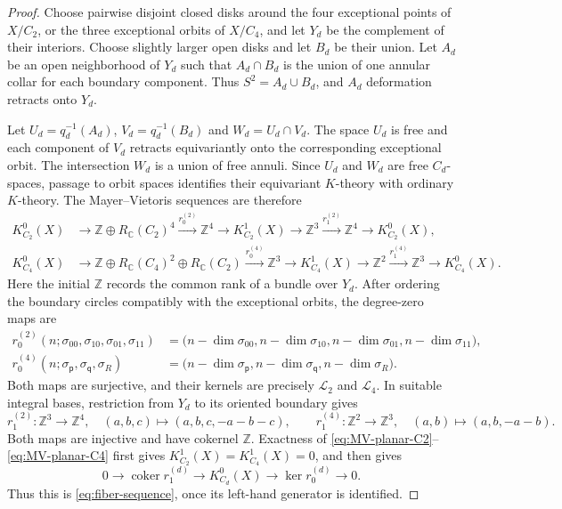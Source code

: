 \documentclass[11pt]{amsart}
\newcommand{\Z}{\mathbb Z}
\newcommand{\C}{\mathbb C}
\newcommand{\coker}{\operatorname{coker}}
\newcommand{\Rep}{R_{\C}}
\theoremstyle{remark}
\numberwithin{equation}{section}
\begin{document}
\begin{proof}
Choose pairwise disjoint closed disks around the four exceptional points of $X/C_2$, or the three exceptional orbits of $X/C_4$, and let $Y_d$ be the complement of their interiors. Choose slightly larger open disks and let $B_d$ be their union. Let $A_d$ be an open neighborhood of $Y_d$ such that $A_d\cap B_d$ is the union of one annular collar for each boundary component. Thus $S^2=A_d\cup B_d$, and $A_d$ deformation retracts onto $Y_d$.

Let $U_d=q_d^{-1}(A_d)$, $V_d=q_d^{-1}(B_d)$ and $W_d=U_d\cap V_d$. The space $U_d$ is free and each component of $V_d$ retracts equivariantly onto the corresponding exceptional orbit. The intersection $W_d$ is a union of free annuli. Since $U_d$ and $W_d$ are free $C_d$-spaces, passage to orbit spaces identifies their equivariant $K$-theory with ordinary $K$-theory. The Mayer--Vietoris sequences are therefore
\begin{align}
 K_{C_2}^0(X)&\longrightarrow
 \Z\oplus\Rep(C_2)^4
 \xrightarrow{r_0^{(2)}}\Z^4
 \longrightarrow K_{C_2}^1(X)
 \longrightarrow\Z^3
 \xrightarrow{r_1^{(2)}}\Z^4
 \longrightarrow K_{C_2}^0(X),
 \label{eq:MV-planar-C2}\\
 K_{C_4}^0(X)&\longrightarrow
 \Z\oplus\Rep(C_4)^2\oplus\Rep(C_2)
 \xrightarrow{r_0^{(4)}}\Z^3
 \longrightarrow K_{C_4}^1(X)
 \longrightarrow\Z^2
 \xrightarrow{r_1^{(4)}}\Z^3
 \longrightarrow K_{C_4}^0(X).
 \label{eq:MV-planar-C4}
\end{align}
Here the initial $\Z$ records the common rank of a bundle over $Y_d$. After ordering the boundary circles compatibly with the exceptional orbits, the degree-zero maps are
\begin{align*}
 r_0^{(2)}(n;\sigma_{00},\sigma_{10},\sigma_{01},\sigma_{11})
 &=\bigl(n-\dim\sigma_{00},n-\dim\sigma_{10},
         n-\dim\sigma_{01},n-\dim\sigma_{11}\bigr),\\
 r_0^{(4)}(n;\sigma_{\mathsf p},\sigma_{\mathsf q},\sigma_R)
 &=\bigl(n-\dim\sigma_{\mathsf p},
         n-\dim\sigma_{\mathsf q},n-\dim\sigma_R\bigr).
\end{align*}
Both maps are surjective, and their kernels are precisely $\mathcal L_2$ and $\mathcal L_4$. In suitable integral bases, restriction from $Y_d$ to its oriented boundary gives
\[
 r_1^{(2)}\colon\Z^3\longrightarrow\Z^4,\quad
 (a,b,c)\longmapsto(a,b,c,-a-b-c),
 \qquad
 r_1^{(4)}\colon\Z^2\longrightarrow\Z^3,\quad
 (a,b)\longmapsto(a,b,-a-b).
\]
Both maps are injective and have cokernel $\Z$. Exactness of \eqref{eq:MV-planar-C2}--\eqref{eq:MV-planar-C4} first gives $K_{C_2}^1(X)=K_{C_4}^1(X)=0$, and then gives
\[
 0\longrightarrow\coker r_1^{(d)}
 \longrightarrow K_{C_d}^0(X)
 \longrightarrow\ker r_0^{(d)}\longrightarrow0.
\]
Thus this is \eqref{eq:fiber-sequence}, once its left-hand generator is identified.


\end{proof}
\end{document}
